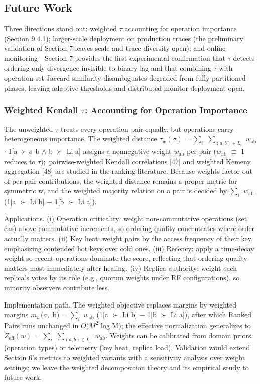 \documentclass[journal]{IEEEtran}
\begin{document}
\subsection{Future Work}
Three directions stand out: weighted $\tau$ accounting for operation importance (Section 9.4.1); larger-scale deployment on production traces (the preliminary validation of Section 7 leaves scale and trace diversity open); and online monitoring—Section 7 provides the first experimental confirmation that $\tau$ detects ordering-only divergence invisible to binary lag and that combining $\tau$ with operation-set Jaccard similarity disambiguates degraded from fully partitioned phases, leaving adaptive thresholds and distributed monitor deployment open.

\subsubsection{Weighted Kendall $\tau$: Accounting for Operation Importance}
The unweighted $\tau$ treats every operation pair equally, but operations carry heterogeneous importance. The weighted distance $\tau_{w}(\sigma)$ = $\sum_{i}$ $\sum_{(a,b)\in L_{i}}$ $w_{\mathrm{ab}}$ $\cdot$ 1[a $\succ\sigma$ b $\wedge$ b $\succ$ Li a] assigns a nonnegative weight $w_{\mathrm{ab}}$ per pair $(w_{\mathrm{ab}}$ $\equiv$ 1 reduces to $\tau);$ pairwise-weighted Kendall correlations [47] and weighted Kemeny aggregation [48] are studied in the ranking literature. Because weights factor out of per-pair contributions, the weighted distance remains a proper metric for symmetric w, and the weighted majority relation on a pair is decided by $\sum_{i}$ $w_{\mathrm{ab}}$ (1[a $\succ$ Li b] $-$ 1[b $\succ$ Li a]).

Applications. (i) Operation criticality: weight non-commutative operations (set, cas) above commutative increments, so ordering quality concentrates where order actually matters. (ii) Key heat: weight pairs by the access frequency of their key, emphasizing contended hot keys over cold ones. (iii) Recency: apply a time-decay weight so recent operations dominate the score, reflecting that ordering quality matters most immediately after healing. (iv) Replica authority: weight each replica's votes by its role (e.g., quorum weights under RF configurations), so minority observers contribute less.

Implementation path. The weighted objective replaces margins by weighted margins $m_{w}(a,$ b) = $\sum_{i}$ $w_{\mathrm{ab}}$ (1[a $\succ$ Li b] $-$ 1[b $\succ$ Li a]), after which Ranked Pairs runs unchanged in $O(M^{2}$ log M); the effective normalization generalizes to $Z_{\mathrm{eff}}(w)$ = $\sum_{i}$ $\sum_{(a,b)\in L_{i}}$ $w_{\mathrm{ab}}.$ Weights can be calibrated from domain priors (operation types) or telemetry (key heat, replica load). Validation would extend Section 6's metrics to weighted variants with a sensitivity analysis over weight settings; we leave the weighted decomposition theory and its empirical study to future work.
\end{document}
